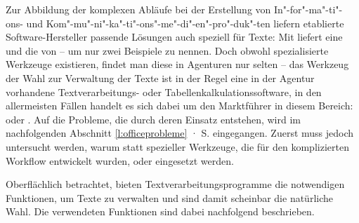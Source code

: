 Zur Abbildung der komplexen Abläufe bei der Erstellung von In"-for"-ma"-ti"-ons- und Kom"-mu"-ni"-ka"-ti"-ons"-me"-di"-en"-pro"-duk"-ten liefern etablierte Software-Hersteller passende Lösungen auch speziell für Texte: Mit  liefert  eine  \cite{adobeincopy} und  die  von   \cite{woodwing} -- um nur zwei Beispiele zu nennen. Doch obwohl spezialisierte Werkzeuge existieren, findet man diese in Agenturen nur selten -- das Werkzeug der Wahl zur Verwaltung der Texte ist in der Regel eine in der Agentur vorhandene Textverarbeitungs- oder Tabellenkalkulationssoftware, in den allermeisten Fällen handelt es sich dabei um den Marktführer in diesem Bereich:   oder . Auf die Probleme, die durch deren Einsatz entstehen, wird im nachfolgenden Abschnitt \ref{l:officeprobleme} · S.\pageref{l:officeprobleme} eingegangen. Zuerst muss jedoch untersucht werden, warum statt spezieller Werkzeuge, die für den komplizierten Workflow entwickelt wurden,  oder  eingesetzt werden.

\bigskip

Oberflächlich betrachtet, bieten Textverarbeitungsprogramme die notwendigen Funktionen, um Texte zu verwalten und sind damit scheinbar die natürliche Wahl. Die verwendeten Funktionen sind dabei nachfolgend beschrieben.

